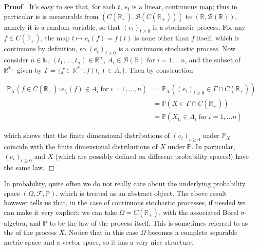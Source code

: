 \documentclass{article}
\newcommand{\tmop}[1]{\ensuremath{\operatorname{#1}}}
\newcommand{\tmtextit}[1]{\text{{\itshape{#1}}}}
\newenvironment{proof}{\noindent\textbf{Proof\ }}{\hspace*{\fill}$\Box$\medskip}
\newcommand{\1}{\mathbbm{1}}
\begin{document}
\begin{proof}
  It's easy to see that, for each $t$, $e_t$ is a linear, continuous map; thus
  in particular is is measurable from $(C (\mathbb{R}_+), \mathcal{B} (C
  (\mathbb{R}_+)))$ to $(\mathbb{R}, \mathcal{B} (\mathbb{R}))$, namely it is
  a random variable, so that $(e_t)_{t \geqslant 0}$ is a stochastic process.
  For any $f \in C (\mathbb{R}_+)$, the map $t \mapsto e_t (f) = f (t)$ is
  none other than $f$ itself, which is continuous by definition, so $(e_t)_{t
  \geqslant 0}$ is a continuous stochastic process. Now consider $n \in
  \mathbb{N}$, $(t_1, \ldots, t_n) \in \mathbb{R}_+^n$, $A_i \in \mathcal{B}
  (\mathbb{R})$ for $i = 1, \ldots n$, and the subset of
  $\mathbb{R}^{\mathbb{R}_+}$ given by $\Gamma = \{ f \in
  \mathbb{R}^{\mathbb{R}_+} : f (t_i) \in A_i \}$. Then by construction

  \begin{align*}
    \mathbb{P}_X (f \in C (\mathbb{R}_+) : e_{t_i} (f) \in A_i \tmop{for} i =
    1, \ldots, n) & =\mathbb{P}_X ((e_t)_{t \geqslant 0} \in \Gamma \cap C
    (\mathbb{R}_+))\\
    & =\mathbb{P} (X \in \Gamma \cap C (\mathbb{R}_+))\\
    & =\mathbb{P} (X_{t_i} \in A_i \tmop{for} i = 1, \ldots n)
  \end{align*}

  which shows that the finite dimensional distributions of $(e_t)_{t \geqslant
  0}$ under $\mathbb{P}_X$ coincide with the finite dimensional distributions
  of $X$ under $\mathbb{P}$. In particular, $(e_t)_{t \geqslant 0}$ and $X$
  (which are possibly defined on different probability spaces!) have the same
  law.
\end{proof}

In probability, quite often we do not really care about the underlying
probability space $(\Omega, \mathcal{F}, \mathbb{P})$, which is treated as an
abstract object. The above result however tells us that, in the case of
continuous stochastic processes, if needed we can make it very explicit: we
can take $\Omega = C (\mathbb{R}_+)$, with the associated Borel
$\sigma$-algebra, and $\mathbb{P}$ to be the law of the process itself. This
is sometimes referred to as the \tmtextit{canonical representation} of the
process $X$. Notice that in this case $\Omega$ becomes a complete separable
metric space and a vector space, so it has a very nice structure.

\
\end{document}
